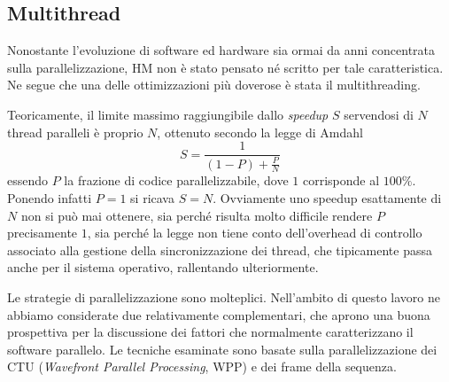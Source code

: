 \subsection{Multithread}
Nonostante l'evoluzione di software ed hardware sia ormai da anni concentrata 
sulla parallelizzazione, HM non è stato pensato né scritto per tale 
caratteristica. Ne segue che una delle ottimizzazioni più doverose è stata il 
multithreading.
\par Teoricamente, il limite massimo raggiungibile dallo \emph{speedup} $S$ 
servendosi 
di $N$ thread paralleli è proprio $N$, ottenuto secondo la legge di Amdahl
$$S = \frac{1}{(1-P)+\frac{P}{N}}$$
essendo $P$ la frazione di codice parallelizzabile, dove $1$ corrisponde al 
$100\%$. Ponendo infatti $P = 1$ si ricava $S = N$. Ovviamente uno speedup 
esattamente di $N$ non si può mai ottenere, sia perché risulta molto difficile 
rendere 
$P$ precisamente $1$, sia perché la legge non tiene conto dell'overhead di 
controllo associato alla gestione della sincronizzazione dei thread, che 
tipicamente passa anche per il sistema operativo, rallentando ulteriormente.
\par Le strategie di parallelizzazione sono molteplici. Nell'ambito di questo 
lavoro ne abbiamo considerate due relativamente complementari, che aprono
una buona prospettiva per la discussione dei fattori che normalmente 
caratterizzano il software parallelo. Le tecniche esaminate sono basate sulla 
parallelizzazione dei CTU (\emph{Wavefront Parallel Processing}, WPP) e dei 
frame della sequenza.

